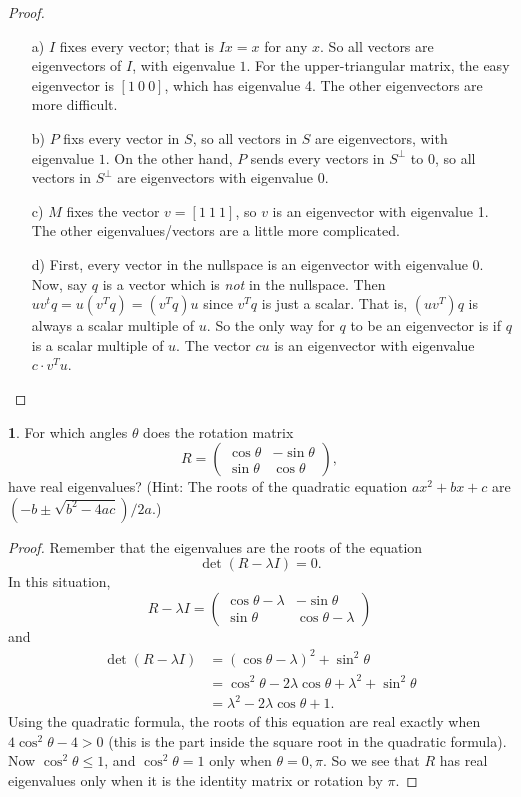 \documentclass{article}
\theoremstyle{definition}
\newtheorem{prob}{}
\begin{document}
\begin{proof}
	\begin{itemize}
		\item[a)] $I$ fixes every vector; that is $Ix=x$ for any $x$. So all vectors are eigenvectors of $I$, with eigenvalue $1$. For the upper-triangular matrix, the easy eigenvector is $[1\ 0 \ 0]$, which has eigenvalue 4. The other eigenvectors are more difficult.
		\item[b)] $P$ fixs every vector in $S$, so all vectors in $S$ are eigenvectors, with eigenvalue $1$. On the other hand, $P$ sends every vectors in $S^\perp$ to $0$, so all vectors in $S^\perp$ are eigenvectors with eigenvalue $0$.
		\item[c)] $M$ fixes the vector $v=[1\ 1 \ 1]$, so $v$ is an eigenvector with eigenvalue 1. The other eigenvalues/vectors are a little more complicated.
		\item[d)] First, every vector in the nullspace is an eigenvector with eigenvalue 0. Now, say $q$ is a vector which is \emph{not} in the nullspace. Then $u v^t q= u(v^Tq)=(v^Tq)u$ since $v^Tq$ is just a scalar. That is, $(u v^T)q$ is always a scalar multiple of $u$. So the only way for $q$ to be an eigenvector is if $q$ is a scalar multiple of $u$. The vector $c u$ is an eigenvector with eigenvalue $c \cdot v^T u$.
	\end{itemize}
\end{proof}
	
\begin{prob} For which angles $\theta$ does the rotation matrix
	\[R = \begin{pmatrix} \cos \theta & -\sin \theta \\ \sin \theta & \cos\theta \end{pmatrix}, \]
	have real eigenvalues? (Hint: The roots of the quadratic equation $ax^2 + bx + c$ are $(-b \pm \sqrt{b^2-4ac})/2a$.)
\end{prob}
\begin{proof}
	Remember that the eigenvalues are the roots of the equation 
	\[\det (R-\lambda I) =0.\]
	In this situation, 
	\[R-\lambda I = \begin{pmatrix} \cos \theta - \lambda & -\sin \theta \\ \sin \theta & \cos\theta-\lambda \end{pmatrix}\]
	and 
	\begin{align*}
		\det(R- \lambda I)&= (\cos \theta - \lambda)^2 + \sin^2 \theta\\
		&=\cos^2 \theta - 2 \lambda \cos\theta + \lambda^2 + \sin^2 \theta\\
		&= \lambda^2 -2 \lambda \cos \theta +1.
	\end{align*}
Using the quadratic formula, the roots of this equation are real exactly when $4 \cos^2 \theta -4>0$ (this is the part inside the square root in the quadratic formula). Now $\cos^2 \theta \leq 1$, and $\cos^2 \theta =1$ only when $\theta=0, \pi$. So we see that $R$ has real eigenvalues only when it is the identity matrix or rotation by $\pi$.
\end{proof}
	
\end{document}
